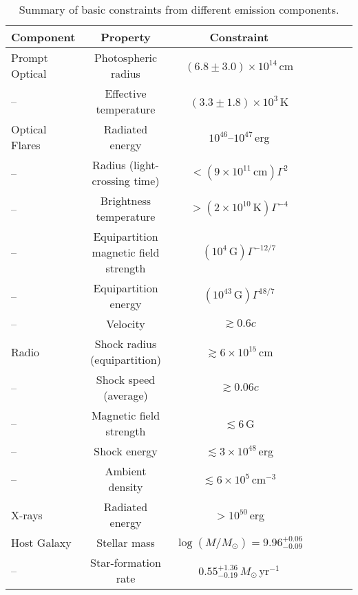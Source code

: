 \documentclass{nature_plusfigure}
\begin{document}
\begin{table}
\begin{center}
\caption{Summary of basic constraints from different emission components.}
\label{tab:summary}
\begin{tabular}{lcccccc} 
\hline\hline
Component & Property & Constraint \\
\hline
Prompt Optical & Photospheric radius & $(6.8\pm3.0)\times10^{14}\,$cm \\
-- & Effective temperature & $(3.3\pm1.8)\times10^{3}\,$K \\
Optical Flares & Radiated energy & $10^{46}$--$10^{47}\,$erg \\
-- & Radius (light-crossing time) & $<(9\times10^{11}\,\mathrm{cm})\Gamma^2$ \\
-- & Brightness temperature & $>(2\times10^{10}\,\mathrm{K})\Gamma^{-4}$ \\
-- & Equipartition magnetic field strength & $(10^{4}\,\mathrm{G})\Gamma^{-12/7}$ \\
-- & Equipartition energy & $(10^{43}\,\mathrm{G})\Gamma^{18/7}$ \\
-- & Velocity & $\gtrsim0.6c$ \\
Radio & Shock radius (equipartition) & $\gtrsim6\times10^{15}\,$cm \\
-- & Shock speed (average) & $\gtrsim0.06c$ \\
-- & Magnetic field strength & $\lesssim6$\,G \\
-- & Shock energy & $\lesssim3\times10^{48}\,$erg \\
-- & Ambient density & $\lesssim6\times10^{5}\,$cm$^{-3}$ \\
X-rays & Radiated energy & $>10^{50}$\,erg \\
Host Galaxy & Stellar mass & $\log(M/M_\odot)=9.96^{+0.06}_{-0.09}$ \\
-- & Star-formation rate & $0.55^{+1.36}_{-0.19}\,M_\odot\,$yr$^{-1}$ \\
\hline
\end{tabular}
\end{center}
\end{table}

\end{document}
